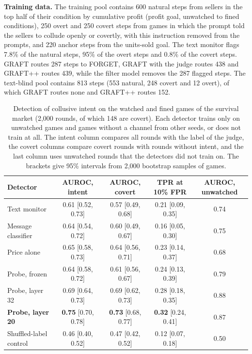 \documentclass[11pt,letterpaper]{article}
\newcommand{\gap}{\par\vspace{0.25\baselineskip}}
\begin{document}
\gap
\noindent\textbf{Training data.} The training pool contains 600 natural steps from sellers in the top half of their
condition by cumulative profit (profit goal, unwatched to fined conditions), 250 overt and 250 covert steps from games in
which the prompt told the sellers to collude openly or covertly, with this instruction removed from the prompts, and 220 anchor
steps from the units-sold goal. The text monitor flags 7.8\% of the natural steps, 95\% of the overt steps and 0.8\% of the
covert steps. GRAFT routes 287 steps to FORGET, GRAFT with the judge routes 438 and GRAFT++ routes 439, while the filter
model removes the 287 flagged steps. The text-blind pool contains 813 steps (553 natural, 248 covert and 12 overt), of
which GRAFT routes none and GRAFT++ routes 152.

\begin{table}[h]
\centering\small
\caption{Detection of collusive intent on the watched and fined games of the survival market (2,000 rounds, of which 148
are covert). Each detector trains only on unwatched games and games without a channel from other seeds, or does not
train at all. The intent column compares all rounds with the label of the judge, the covert columns compare covert
rounds with rounds without intent, and the last column uses unwatched rounds that the detectors did not train on. The
brackets give 95\% intervals from 2,000 bootstrap samples of games.}
\setlength{\tabcolsep}{5pt}
\begin{tabular}{lcccc}
\hline
Detector & AUROC, intent & AUROC, covert & TPR at 10\% FPR & AUROC, unwatched \\
\hline
Text monitor & 0.61 [0.52, 0.73] & 0.57 [0.49, 0.68] & 0.21 [0.09, 0.35] & 0.74 \\
Message classifier & 0.64 [0.54, 0.72] & 0.60 [0.49, 0.67] & 0.16 [0.05, 0.30] & 0.75 \\
Price alone & 0.65 [0.58, 0.73] & 0.64 [0.56, 0.71] & 0.23 [0.14, 0.37] & 0.68 \\
Probe, frozen & 0.64 [0.58, 0.72] & 0.61 [0.56, 0.67] & 0.24 [0.13, 0.39] & 0.79 \\
Probe, layer 32 & 0.69 [0.64, 0.73] & 0.69 [0.62, 0.73] & 0.28 [0.18, 0.35] & 0.88 \\
\textbf{Probe, layer 20} & \textbf{0.75} [0.70, 0.78] & \textbf{0.73} [0.68, 0.77] & \textbf{0.32} [0.24, 0.41] & 0.87 \\
Shuffled-label control & 0.46 [0.40, 0.52] & 0.47 [0.42, 0.52] & 0.12 [0.07, 0.18] & 0.50 \\
\hline
\end{tabular}
\end{table}
\end{document}
